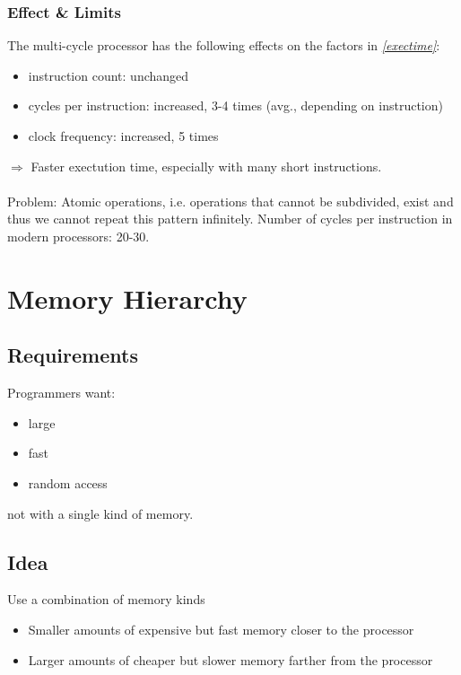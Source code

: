 \documentclass{article}
\begin{document}
\subsubsection{Effect \& Limits}
The multi-cycle processor has the following effects on the factors in \emph{\ref{exectime}}:
\begin{itemize}
	\item instruction count: unchanged
	\item cycles per instruction: increased, 3-4 times (avg., depending on instruction)
	\item clock frequency: increased, 5 times
\end{itemize}
$\Rightarrow$ Faster exectution time, especially with many short instructions.\\\\
Problem: Atomic operations, i.e. operations that cannot be subdivided, exist and thus we cannot
repeat this pattern infinitely. Number of cycles per instruction in modern processors: 20-30.



\section{Memory Hierarchy}



\subsection{Requirements}


Programmers want:
\begin{itemize}
	\item large
	\item fast
	\item random access
\end{itemize}
\Rightarrow not with a single kind of memory.


\subsection{Idea}


Use a combination of memory kinds
\begin{itemize}
	\item Smaller amounts of expensive but fast memory closer to the processor
	\item Larger amounts of cheaper but slower memory farther from the processor
\end{itemize}
\end{document}
